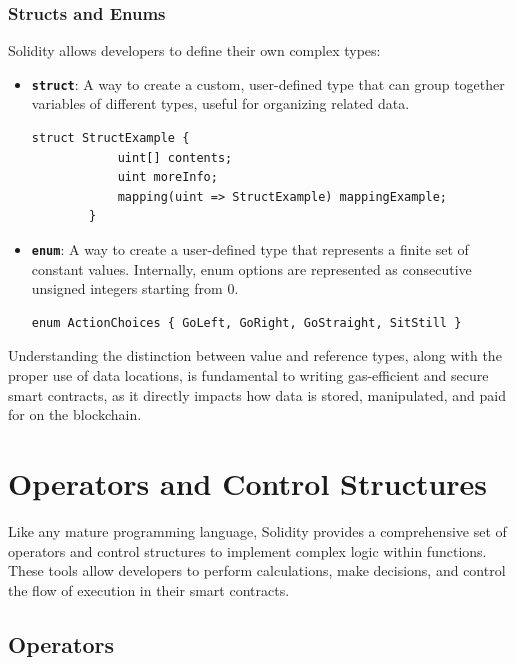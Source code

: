 \documentclass{scrbook}
\begin{document}
\subsection{Structs and Enums}

Solidity allows developers to define their own complex types:

\begin{itemize}
    \item \texttt{\textbf{struct}}: A way to create a custom, user-defined type that can group together variables of different types, useful for organizing related data.

    \begin{lstlisting}[caption={struct example}]
        struct StructExample {
            uint[] contents;
            uint moreInfo;
            mapping(uint => StructExample) mappingExample;
        }
    \end{lstlisting}
    
    \item \texttt{\textbf{enum}}: A way to create a user-defined type that represents a finite set of constant values. Internally, enum options are represented as consecutive unsigned integers starting from 0.

    \begin{lstlisting}[caption={enum example}]
        enum ActionChoices { GoLeft, GoRight, GoStraight, SitStill }
    \end{lstlisting}
\end{itemize}

Understanding the distinction between value and reference types, along with the proper use of data locations, is fundamental to writing gas-efficient and secure smart contracts, as it directly impacts how data is stored, manipulated, and paid for on the blockchain.

\chapter{Operators and Control Structures}

Like any mature programming language, Solidity provides a comprehensive set of operators and control structures to implement complex logic within functions. These tools allow developers to perform calculations, make decisions, and control the flow of execution in their smart contracts.

\section{Operators}
\end{document}
